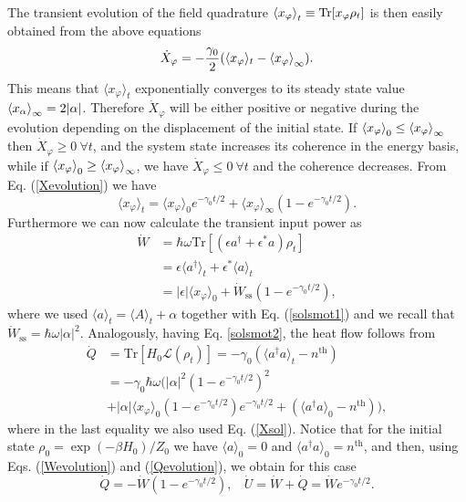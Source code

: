 \documentclass[aps,prx,twocolumn,showpacs,floatfix,superscriptaddress,graphics,longbibliography]{revtex4-1}
\newcommand{\tr}{\mathrm{Tr}}
\begin{document}
The transient evolution of the field quadrature $\braket{x_{\varphi}}_t \equiv \tr[x_{\varphi} \rho_t]$ is then easily obtained 
from the above equations
\begin{equation} \label{Xevolution}
\dot{X}_{\varphi} = - \frac{\gamma_0}{2}(\langle x_{\varphi}\rangle_t  - \braket{x_{\varphi}}_{\infty}).
\end{equation}
This means that $\langle x_{\varphi} \rangle_t$ exponentially converges to its steady state value $\braket{x_\alpha}_{\infty} = 2 |\alpha|$. Therefore $\dot{X}_{\varphi}$ will be either positive 
or negative during the evolution depending on the displacement of the initial state. If $\braket{x_{\varphi}}_{0} \leq \braket{x_{\varphi}}_{\infty}$ then $\dot{X}_{\varphi} \geq 0~ \forall t$, 
and the system state increases its coherence in the energy basis, while if $\braket{x_{\varphi}}_{0} \geq \braket{x_{\varphi}}_{\infty}$, we have $\dot{X}_{\varphi} \leq 0~ \forall t$ and the coherence 
decreases. From Eq. (\ref{Xevolution}) we have
\begin{equation} \label{Xsol}
\langle x_{\varphi} \rangle_t = \langle x _{\varphi}\rangle_{0} e^{-\gamma_0 t/2} + \langle x _{\varphi} \rangle_{\infty} (1 - e^{-\gamma_0 t/2}).
\end{equation}
Furthermore we can now calculate the transient input power as
\begin{align} \label{Wevolution}
 \dot{W} & = \hbar \omega \tr[(\epsilon a^\dagger + \epsilon^\ast a) \rho_t] \nonumber \\
 & = \epsilon \langle a^\dagger \rangle_t + \epsilon^\ast \langle a \rangle_t \nonumber \\
 & = |\epsilon|\langle x_{\varphi} \rangle_{0} + \dot{W}_\mathrm{ss} (1 - e^{-\gamma_0 t/2}),
\end{align}
where we used $\langle a \rangle_t = \langle A \rangle_t + \alpha$ together with Eq. (\ref{solsmot1}) and we recall that $\dot{W}_\mathrm{ss} = \hbar \omega |\alpha|^2$. Analogously, having Eq. \eqref{solsmot2}, the heat flow follows from
\begin{align} \label{Qevolution}
 \dot{Q} &= \tr[H_0 \mathcal{L}(\rho_t)] = - \gamma_0(\langle a^\dagger a \rangle_t - n^{\mathrm{th}}) \\ 
 &= - \gamma_0 \hbar \omega \big( |\alpha|^2 (1- e^{-\gamma_0 t /2})^2 \nonumber \\ 
 & +  |\alpha| \langle x_{\varphi} \rangle_{0} (1- e^{- \gamma_0 t /2}) e^{-\gamma_0 t/2} + (\langle a^\dagger a \rangle_{0} - n^{\mathrm{th}}) \big), \nonumber
\end{align}
where in the last equality we also used Eq. (\ref{Xsol}). Notice that for the initial state $\rho_0 = \exp(-\beta H_0)/Z_0$ we have $\langle a \rangle_0 = 0$ and $\langle a^\dagger a \rangle_0 = n^{\mathrm{th}}$, and then, using Eqs. (\ref{Wevolution}) 
and (\ref{Qevolution}), we obtain for this case 
\begin{equation}
 \dot{Q} = - \dot{W}(1 - e^{- \gamma_0 t /2}), ~~~~ \dot{U} = \dot{W} + \dot{Q} = \dot{W} e^{- \gamma_0 t /2}.
\end{equation}
\end{document}
